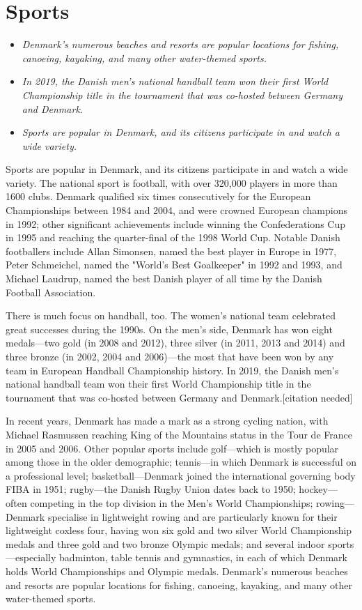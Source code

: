 \section{Sports}\label{sports}

\begin{itemize}
\item
  \emph{Denmark's numerous beaches and resorts are popular locations for
  fishing, canoeing, kayaking, and many other water-themed sports.}
\item
  \emph{In 2019, the Danish men's national handball team won their first
  World Championship title in the tournament that was co-hosted between
  Germany and Denmark.}
\item
  \emph{Sports are popular in Denmark, and its citizens participate in
  and watch a wide variety.}
\end{itemize}

Sports are popular in Denmark, and its citizens participate in and watch
a wide variety. The national sport is football, with over 320,000
players in more than 1600 clubs. Denmark qualified six times
consecutively for the European Championships between 1984 and 2004, and
were crowned European champions in 1992; other significant achievements
include winning the Confederations Cup in 1995 and reaching the
quarter-final of the 1998 World Cup. Notable Danish footballers include
Allan Simonsen, named the best player in Europe in 1977, Peter
Schmeichel, named the "World's Best Goalkeeper" in 1992 and 1993, and
Michael Laudrup, named the best Danish player of all time by the Danish
Football Association.

There is much focus on handball, too. The women's national team
celebrated great successes during the 1990s. On the men's side, Denmark
has won eight medals---two gold (in 2008 and 2012), three silver (in
2011, 2013 and 2014) and three bronze (in 2002, 2004 and 2006)---the
most that have been won by any team in European Handball Championship
history. In 2019, the Danish men's national handball team won their
first World Championship title in the tournament that was co-hosted
between Germany and Denmark.{[}citation needed{]}

In recent years, Denmark has made a mark as a strong cycling nation,
with Michael Rasmussen reaching King of the Mountains status in the Tour
de France in 2005 and 2006. Other popular sports include golf---which is
mostly popular among those in the older demographic; tennis---in which
Denmark is successful on a professional level; basketball---Denmark
joined the international governing body FIBA in 1951; rugby---the Danish
Rugby Union dates back to 1950; hockey--- often competing in the top
division in the Men's World Championships; rowing---Denmark specialise
in lightweight rowing and are particularly known for their lightweight
coxless four, having won six gold and two silver World Championship
medals and three gold and two bronze Olympic medals; and several indoor
sports---especially badminton, table tennis and gymnastics, in each of
which Denmark holds World Championships and Olympic medals. Denmark's
numerous beaches and resorts are popular locations for fishing,
canoeing, kayaking, and many other water-themed sports.

